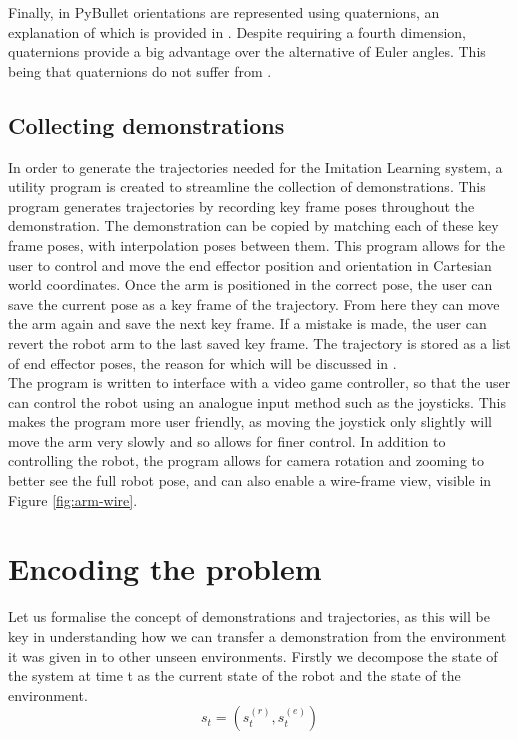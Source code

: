 Finally, in PyBullet orientations are represented using quaternions, \cite{quaternions, orientations} an explanation of which is provided in . Despite requiring a fourth dimension, quaternions provide a big advantage over the alternative of Euler angles. This being that quaternions do not suffer from  \cite{gimbal, gimbal-lock}.

\subsection{Collecting demonstrations}
In order to generate the trajectories needed for the Imitation Learning system, a utility program is created to streamline the collection of demonstrations. This program generates trajectories by recording key frame poses throughout the demonstration. The demonstration can be copied by matching each of these key frame poses, with interpolation poses between them. This program allows for the user to control and move the end effector position and orientation in Cartesian world coordinates. Once the arm is positioned in the correct pose, the user can save the current pose as a key frame of the trajectory. From here they can move the arm again and save the next key frame. If a mistake is made, the user can revert the robot arm to the last saved key frame. The trajectory is stored as a list of end effector poses, the reason for which will be discussed in .\\

The program is written to interface with a video game controller, so that the user can control the robot using an analogue input method such as the joysticks. This makes the program more user friendly, as moving the joystick only slightly will move the arm very slowly and so allows for finer control. In addition to controlling the robot, the program allows for camera rotation and zooming to better see the full robot pose, and can also enable a wire-frame view, visible in Figure \ref{fig:arm-wire}.


\section{Encoding the problem}
\label{sec:trajectories}
Let us formalise the concept of demonstrations and trajectories, as this will be key in understanding how we can transfer a demonstration from the environment it was given in to other unseen environments. Firstly we decompose the state of the system at time t as the current state of the robot and the state of the environment.
$$s_t = (s^{(r)}_t, s^{(e)}_t)$$

